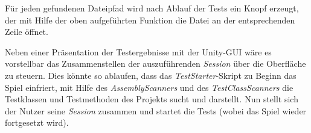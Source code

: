 Für jeden gefundenen Dateipfad wird nach Ablauf der Tests ein Knopf erzeugt, der mit Hilfe der oben aufgeführten Funktion die Datei an der entsprechenden Zeile öffnet.

Neben einer Präsentation der Testergebnisse mit der Unity-GUI wäre es vorstellbar das Zusammenstellen der auszuführenden \textit{Session} über die Oberfläche zu steuern. Dies könnte so ablaufen, dass das \textit{TestStarter}-Skript zu Beginn das Spiel einfriert, mit Hilfe des \textit{AssemblyScanners} und des \textit{TestClassScanners} die Testklassen und Testmethoden des Projekts sucht und darstellt. Nun stellt sich der Nutzer seine \textit{Session} zusammen und startet die Tests (wobei das Spiel wieder fortgesetzt wird).